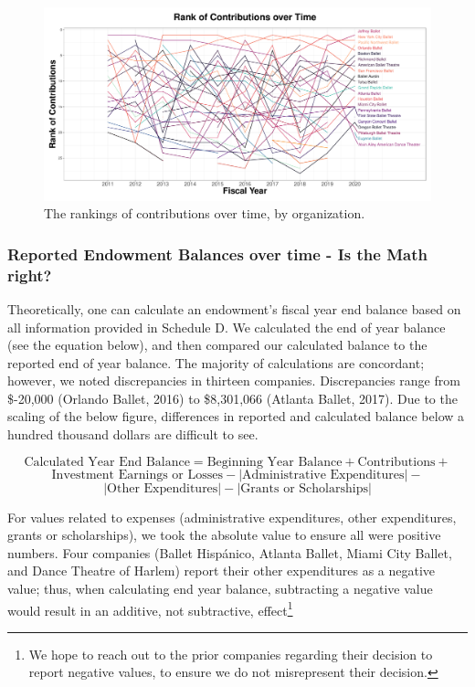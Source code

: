 \documentclass[Dance Data
Project,article,submit,moreauthors,pdftex]{mdpi}
\begin{document}
\begin{figure}[H]
\includegraphics[width=0.9\linewidth,]{../images/ranking-contributions} \caption{\label{fig:rankings-contributions}The rankings of contributions over time, by organization.}\label{fig:ranking-contributions}
\end{figure}

\hypertarget{reported-endowment-balances-over-time---is-the-math-right}{%
\subsubsection{Reported Endowment Balances over time - Is the Math
right?}\label{reported-endowment-balances-over-time---is-the-math-right}}

Theoretically, one can calculate an endowment's fiscal year end balance
based on all information provided in Schedule D. We calculated the end
of year balance (see the equation below), and then compared our
calculated balance to the reported end of year balance. The majority of
calculations are concordant; however, we noted discrepancies in thirteen
companies. Discrepancies range from \$-20,000 (Orlando Ballet, 2016) to
\$8,301,066 (Atlanta Ballet, 2017). Due to the scaling of the below
figure, differences in reported and calculated balance below a hundred
thousand dollars are difficult to see.

\[\text{Calculated Year End Balance} = \text{Beginning Year Balance} + \text{Contributions} +\]
\[ \text{Investment Earnings or Losses} - |\text{Administrative Expenditures}| -\]
\[|\text{Other Expenditures}| - | \text{Grants or Scholarships}| \tag{1}\]

For values related to expenses (administrative expenditures, other
expenditures, grants or scholarships), we took the absolute value to
ensure all were positive numbers. Four companies (Ballet Hispánico,
Atlanta Ballet, Miami City Ballet, and Dance Theatre of Harlem) report
their other expenditures as a negative value; thus, when calculating end
year balance, subtracting a negative value would result in an additive,
not subtractive, effect\footnote{We hope to reach out to the prior
  companies regarding their decision to report negative values, to
  ensure we do not misrepresent their decision.}
\end{document}
